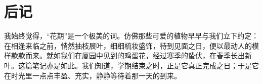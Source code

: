 
\chapter*{后\hspace{1em}记}

我始终觉得，“花期”是一个极美的词。仿佛那些可爱的植物早早与我们立下约定：在相逢来临之前，悄然抽枝展叶，细细梳妆盛饰，待到见面之日，便以最动人的模样款款而来。就如我们在厦园中见到的鸡蛋花，经过寒季的蛰伏，在春季长出新叶。这篇笔记亦是如此。我们知道，学期结束之时，正是它真正完成之日；于是它在时光里一点点丰盈、充实，静静等待着那一天的到来。

